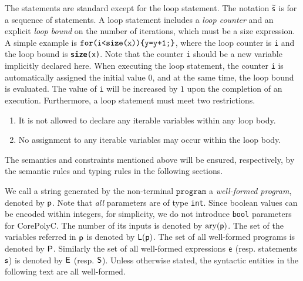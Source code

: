 \documentclass[runningheads]{llncs}
\begin{document}
The statements are standard except for the loop statement.
The notation $\widetilde{\s}$ is for a sequence of statements.
A loop statement includes a \textit{loop counter} and an explicit \textit{loop bound} on the number of iterations, which must be a size expression.
A simple example is $\texttt{\textbf{for}(i<\textbf{size}(x))\{y=y+1;\}}$,
where the loop counter is \texttt{i} and the loop bound is \texttt{\textbf{size}(x)}.
Note that the counter \texttt{i} should be a new variable implicitly declared here.
When executing the loop statement, the counter \texttt{i} is automatically assigned the initial value $0$, and at the same time, the loop bound is evaluated.
The value of \texttt{i} will be increased by $1$ upon the completion of an execution.
Furthermore, a loop statement must meet two restrictions.
\begin{enumerate}
    \item It is not allowed to declare any iterable variables within any loop body.
    \item No assignment to any iterable variables may occur within the loop body.
\end{enumerate}
The semantics and constraints mentioned above will be ensured, respectively, by the semantic rules and typing rules in the following sections.

We call a string generated by the non-terminal $\texttt{program}$ a \textit{well-formed program}, denoted by $\p$.
Note that \emph{all} parameters are of type \texttt{int}.
Since boolean values can be encoded within integers, for simplicity, we do not introduce \texttt{bool} parameters for CorePolyC.
The number of its inputs is denoted by $\arity{(\p)}$.
The set of the variables referred in $\p$ is denoted by $\L(\p)$.
The set of all well-formed programs is denoted by $\P$.
Similarly the set of all well-formed expressions $\e$ (resp. statements $\s$) is denoted by $\E$ (resp. $\S$).
Unless otherwise stated, the syntactic entities in the following text are all well-formed.
\end{document}
